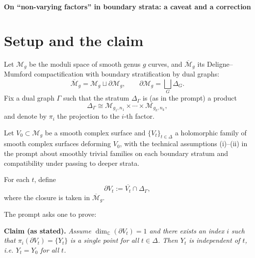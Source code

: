 \documentclass[11pt]{article}
\newcommand{\Mg}{\mathcal M_g}
\newcommand{\Mgn}[2]{\mathcal M_{#1,#2}}
\newcommand{\Mbar}{\overline{\mathcal M}_g}
\newcommand{\C}{\mathbb C}
\newcommand{\D}{\Delta}
\begin{document}
\begin{center}
{\Large\bf On ``non-varying factors'' in boundary strata: a caveat and a correction}\\[0.5em]
\end{center}

\begin{abstract}
We explain that the conclusion requested in the prompt (constancy of the point $Y_t$ on a non-varying factor) does \emph{not} follow from the stated stratified-triviality assumptions alone: one can construct holomorphic families $V_t\subset \mathcal M_g$ whose boundary curves in a fixed stratum $\Delta_\Gamma$ are of the form $\{Y_t\}\times C$ with $Y_t$ varying holomorphically. We then record a standard sufficient strengthening (namely that $V_t$ remain totally geodesic) under which the desired conclusion holds, via finiteness of higher-dimensional totally geodesic subvarieties.
\end{abstract}

\section{Setup and the claim}

Let $\Mg$ be the moduli space of smooth genus $g$ curves, and $\Mbar$ its Deligne--Mumford compactification with boundary stratification by dual graphs:
\[
\Mbar=\Mg\sqcup \partial\Mg,\qquad
\partial\Mg=\bigsqcup_G \Delta_G.
\]
Fix a dual graph $\Gamma$ such that the stratum $\Delta_\Gamma$ is (as in the prompt) a product
\[
\Delta_\Gamma \cong \Mgn{g_1}{n_1}\times\cdots\times \Mgn{g_k}{n_k},
\]
and denote by $\pi_i$ the projection to the $i$-th factor.

Let $V_0\subset \Mg$ be a smooth complex surface and $\{V_t\}_{t\in\D}$ a holomorphic family of smooth complex surfaces deforming $V_0$, with the technical assumptions (i)--(ii) in the prompt about smoothly trivial families on each boundary stratum and compatibility under passing to deeper strata.

For each $t$, define
\[
\partial V_t:=\overline{V_t}\cap \Delta_\Gamma,
\]
where the closure is taken in $\Mbar$.

The prompt asks one to prove:

\medskip
\noindent\textbf{Claim (as stated).}
\emph{Assume $\dim_\C(\partial V_t)=1$ and there exists an index $i$ such that $\pi_i(\partial V_t)=\{Y_t\}$ is a single point for all $t\in\D$. Then $Y_t$ is independent of $t$, i.e. $Y_t=Y_0$ for all $t$.}
\medskip
\end{document}
